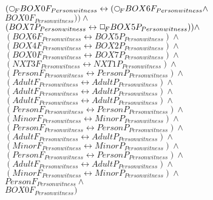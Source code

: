 \documentclass[a4paper,10pt]{article}
\begin{document}
 $ ( \Rnext BOX0F_{Personwitness} \leftrightarrow ( \Rnext BOX6F_{Personwitness} \land $ \\ 
 $ BOX0F_{Personwitness})) \land $ \\ 
 $ (BOX7P_{Personwitness} \leftrightarrow  \Box_{\!F} BOX5P_{Personwitness})) \land $ \\ 
 $ (BOX6F_{Personwitness} \leftrightarrow BOX5P_{Personwitness}) \land $ \\ 
 $ (BOX4F_{Personwitness} \leftrightarrow BOX2P_{Personwitness}) \land $ \\ 
 $ (BOX0F_{Personwitness} \leftrightarrow BOX7P_{Personwitness}) \land $ \\ 
 $ (NXT3F_{Personwitness} \leftrightarrow NXT1P_{Personwitness}) \land $ \\ 
 $ (PersonF_{Personwitness} \leftrightarrow PersonP_{Personwitness}) \land $ \\ 
 $ (AdultF_{Personwitness} \leftrightarrow AdultP_{Personwitness}) \land $ \\ 
 $ (AdultF_{Personwitness} \leftrightarrow AdultP_{Personwitness}) \land $ \\ 
 $ (AdultF_{Personwitness} \leftrightarrow AdultP_{Personwitness}) \land $ \\ 
 $ (PersonF_{Personwitness} \leftrightarrow PersonP_{Personwitness}) \land $ \\ 
 $ (MinorF_{Personwitness} \leftrightarrow MinorP_{Personwitness}) \land $ \\ 
 $ (PersonF_{Personwitness} \leftrightarrow PersonP_{Personwitness}) \land $ \\ 
 $ (AdultF_{Personwitness} \leftrightarrow AdultP_{Personwitness}) \land $ \\ 
 $ (MinorF_{Personwitness} \leftrightarrow MinorP_{Personwitness}) \land $ \\ 
 $ (PersonF_{Personwitness} \leftrightarrow PersonP_{Personwitness}) \land $ \\ 
 $ (AdultF_{Personwitness} \leftrightarrow AdultP_{Personwitness}) \land $ \\ 
 $ (MinorF_{Personwitness} \leftrightarrow MinorP_{Personwitness}) \land $ \\ 
 $ PersonF_{Personwitness} \land $ \\ 
 $ BOX0F_{Personwitness})$ 
\end{document}
